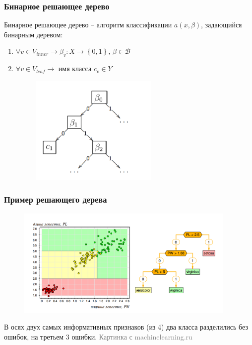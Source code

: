 \documentclass[12pt]{beamer}
\begin{document}
\begin{frame}\frametitle{Бинарное решающее дерево}
Бинарное решающее дерево -- алгоритм классификации $a(x, \beta)$, задающийся бинарным деревом:\\
\begin{enumerate}[--]
\item $\forall v \in V_{inner} \rightarrow \beta_v: X \rightarrow \left\{ 0,1\right\}$, $\beta \in \mathcal{B}$
\item $\forall v \in V_{leaf} \rightarrow $ имя класса $c_v \in Y$\\

\begin{figure}[htbp]
  \includegraphics[height=150pt, keepaspectratio = true]{images/binary_tree}   
\end{figure}
\end{enumerate}
\end{frame}

\begin{frame}\frametitle{Пример решающего дерева}
\begin{figure}[htbp]
  \includegraphics[height=150pt, keepaspectratio = true]{images/fisher}   
\end{figure}
В осях двух самых информативных признаков (из 4)
два класса разделились без ошибок, на третьем 3 ошибки.
\footnotesize\textcolor{gray} {Картинка с machinelearning.ru}

\end{frame}
\end{document}
